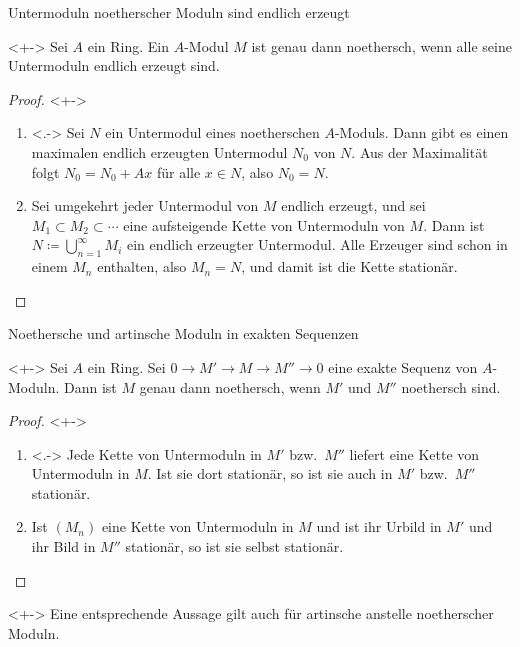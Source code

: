 \begin{frame}{Untermoduln noetherscher Moduln sind endlich erzeugt}
	\begin{proposition}<+->
		Sei \(A\) ein Ring. Ein \(A\)-Modul \(M\) ist genau dann noethersch,
		wenn alle seine Untermoduln endlich erzeugt sind.
	\end{proposition}
	\begin{proof}<+->
		\begin{enumerate}[<+->]
		\item<.->
			Sei \(N\) ein Untermodul eines noetherschen \(A\)-Moduls. Dann gibt es
			einen maximalen endlich erzeugten Untermodul \(N_0\) von \(N\). Aus der
			Maximalität folgt \(N_0 = N_0 + Ax\) für alle \(x \in N\), also \(N_0 = N\).
		\item
			Sei umgekehrt  jeder Untermodul von \(M\) endlich erzeugt, und sei
			\(M_1 \subset M_2 \subset \dotsb\) eine aufsteigende Kette von Untermoduln von \(M\).
			Dann ist \(N \coloneqq \bigcup\limits_{n = 1}^\infty M_i\) ein endlich erzeugter
			Untermodul. Alle Erzeuger sind schon in einem \(M_n\) enthalten, also \(M_n = N\),
			und damit ist die Kette stationär.
			\qedhere
		\end{enumerate}
	\end{proof}
\end{frame}


\begin{frame}{Noethersche und artinsche Moduln in exakten Sequenzen}
	\begin{proposition}<+->
		Sei \(A\) ein Ring. Sei \(0 \to M' \to M \to M'' \to 0\) eine exakte Sequenz
		von \(A\)-Moduln. Dann ist \(M\) genau dann noethersch, wenn \(M'\) und \(M''\)
		noethersch sind.
	\end{proposition}
	\begin{proof}<+->
		\begin{enumerate}[<+->]
		\item<.->
			Jede Kette von Untermoduln in \(M'\) bzw.\ \(M''\) liefert eine Kette
			von Untermoduln in \(M\). Ist sie dort stationär, so ist sie auch in
			\(M'\) bzw.\ \(M''\) stationär.
		\item
			Ist \((M_n)\) eine Kette von Untermoduln in \(M\) und ist ihr Urbild in \(M'\) und
			ihr Bild in \(M''\) stationär, so ist sie selbst stationär.
			\qedhere
		\end{enumerate}
	\end{proof}
	\begin{remark}<+->
		Eine entsprechende Aussage gilt auch für artinsche anstelle noetherscher Moduln.
	\end{remark}
\end{frame}

